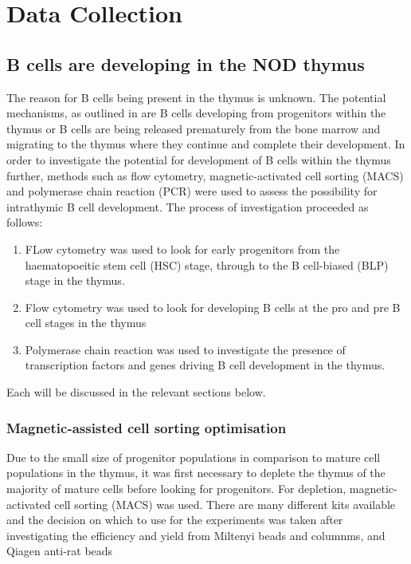 
\chapter{Data Collection}




\section{B cells are developing in the NOD thymus}
The reason for B cells being present in the thymus is unknown. 
The potential mechanisms, as outlined in  are B cells developing from progenitors within the thymus or B cells are being released prematurely from the bone marrow and migrating to the thymus where they continue and complete their development.
In order to investigate the potential for development of B cells within the thymus further, methods such as flow cytometry, magnetic-activated cell sorting (MACS) and polymerase chain reaction (PCR) were used to assess the possibility for intrathymic B cell development.
The process of investigation proceeded as follows:
\begin{enumerate}
\item FLow cytometry was used to look for early progenitors from the haematopoeitic stem cell (HSC) stage, through to the B cell-biased (BLP) stage in the thymus. 
\item Flow cytometry was used to look for developing B cells at the pro and pre B cell stages in the thymus 
\item Polymerase chain reaction was used to investigate the presence of transcription factors and genes driving B cell development in the  thymus. 
\end{enumerate}

Each will be discussed in the relevant sections below.

\subsection{Magnetic-assisted cell sorting optimisation}

Due to the small size of progenitor populations in comparison to mature cell populations in the thymus, it was first necessary to deplete the thymus of the majority of mature cells before looking for progenitors.
For depletion, magnetic-activated cell sorting (MACS) was used.
There are many different kits available and the decision on which to use for the experiments was taken after investigating the efficiency and yield from Miltenyi beads and columnms, and Qiagen anti-rat beads 

